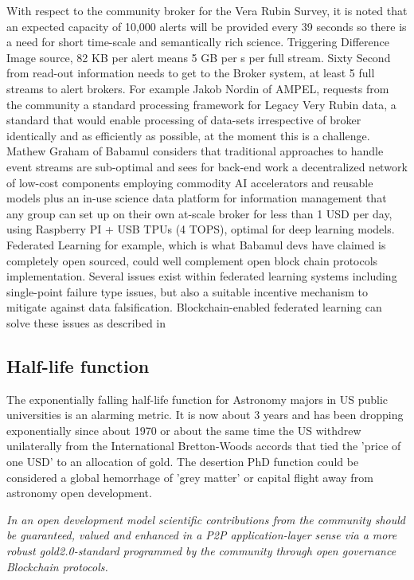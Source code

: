 \documentclass[final,5p,times,twocolumn,authoryear]{elsarticle}
\begin{document}
With respect to the community broker for the Vera Rubin Survey, it is noted that an expected capacity of 10,000 alerts will be provided every 39 seconds so there is a need for short time-scale and semantically rich science. Triggering Difference Image source, 82 KB per alert means 5 GB per s per full stream. Sixty Second from read-out information needs to get to the Broker system, at least 5 full streams to alert brokers.   For example  Jakob Nordin of AMPEL, requests from the community a standard processing framework for Legacy Very Rubin data, a standard that would enable processing of data-sets irrespective of broker identically and as efficiently as possible, at the moment this is a challenge.  Mathew Graham of Babamul considers that traditional approaches to handle event streams are sub-optimal and sees for back-end work a decentralized network of low-cost components employing commodity AI accelerators and reusable models plus an in-use science data platform for information management that any group can set up on their own at-scale broker for less than 1 USD per day, using Raspberry PI + USB TPUs (4 TOPS), optimal for deep learning models.  Federated Learning for example, which is what Babamul devs have claimed is completely open sourced, could well complement open block chain protocols implementation. Several issues exist within federated learning systems including single-point failure type issues, but also a suitable incentive mechanism to mitigate against data falsification. Blockchain-enabled federated learning can solve these issues as described in \cite{zhu2023} 


\subsection{Half-life function}
\label{btc2:sec:sub:half}

The exponentially falling half-life function for Astronomy majors in US public universities is an alarming metric. It is now about 3 years and has been dropping exponentially since about 1970 or about the same time the US withdrew unilaterally from the International Bretton-Woods accords that tied the 'price of one USD' to an allocation of gold. The desertion PhD function could be considered a global hemorrhage of 'grey matter' or capital flight away from astronomy open development.

\emph{In an open development model scientific contributions from the community should be guaranteed, valued and enhanced in a P2P application-layer sense via a more robust gold2.0-standard programmed by the community through open governance Blockchain protocols.}
\end{document}
